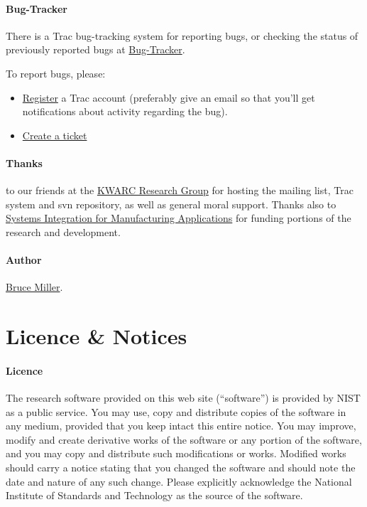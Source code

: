 \documentclass{article}
\begin{document}
\paragraph{Bug-Tracker}
  There is a Trac bug-tracking system for reporting bugs, or checking the
  status of previously reported bugs at
 \href{https://trac.mathweb.org/LaTeXML/}{Bug-Tracker}.

To report bugs, please:
\begin{itemize}
\item \href{http://trac.mathweb.org/register/register}{Register} a Trac account
  (preferably give an email so that you'll get notifications about activity regarding the bug).
\item \href{http://trac.mathweb.org/LaTeXML/newticket}{Create a ticket}
\end{itemize} 

\paragraph{Thanks} to our friends at
the \href{http://kwarc.info}{KWARC Research Group}
for hosting the mailing list, Trac system and svn repository,
as well as general moral support.
Thanks also to \href{http://www.nist.gov/el/msid/sima/}{Systems Integration for Manufacturing Applications}
for funding portions of the research and development.

\paragraph{Author} \href{mailto:bruce.miller@nist.gov}{Bruce Miller}.
\section{Licence \& Notices}\label{notices}

\paragraph{Licence}
The research software provided on this web site (``software'') is
provided by NIST as a public service. You may use, copy and distribute
copies of the software in any medium, provided that you keep intact
this entire notice. You may improve, modify and create derivative
works of the software or any portion of the software, and you may copy
and distribute such modifications or works. Modified works should
carry a notice stating that you changed the software and should note
the date and nature of any such change. Please explicitly acknowledge
the National Institute of Standards and Technology as the source of
the software.
\end{document}
